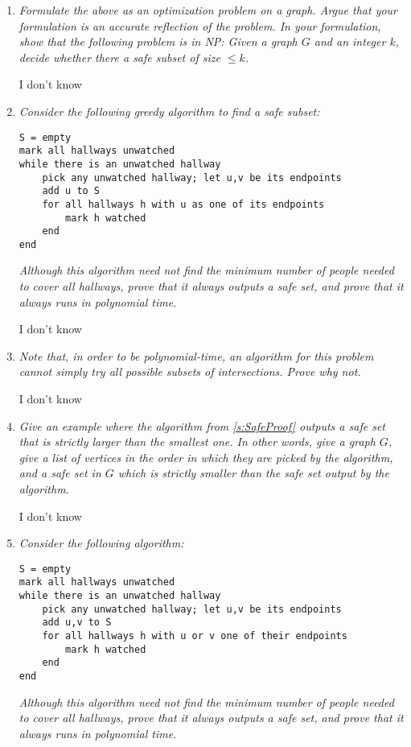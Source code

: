 \documentclass[12pt]{article} \setlength{\oddsidemargin}{0in}
\begin{document}
\begin{enumerate} 
\item\textit{Formulate the above as an optimization problem on a graph. Argue that your formulation is an accurate reflection of the problem. In your formulation, show that the following problem is in NP: Given a graph $G$ and an integer $k$, decide whether there a safe subset of size $\leq k$.}

I don't know 

\item\textit{Consider the following greedy algorithm to find a safe subset:} %
\begin{verbatim}
S = empty
mark all hallways unwatched
while there is an unwatched hallway
    pick any unwatched hallway; let u,v be its endpoints
    add u to S
    for all hallways h with u as one of its endpoints
        mark h watched
    end
end
\end{verbatim}
\textit{Although this algorithm need not find the minimum number of people needed to cover all hallways, prove that it always outputs a safe set, and prove that it always runs in polynomial time.}\label{s:SafeProof}

I don't know 
\item\textit{Note that, in order to be polynomial-time, an algorithm for this problem cannot simply try all possible subsets of intersections. Prove why not.}

I don't know 

\item\textit{Give an example where the algorithm from \ref{s:SafeProof} outputs a safe set that is strictly larger than the smallest one. In other words, give a graph $G$, give a list of vertices in the order in which they are picked by the algorithm, and a safe set in $G$ which is strictly smaller than the safe set output by the algorithm.}

I don't know 

\item\textit{Consider the following algorithm:} %
\begin{verbatim}
S = empty
mark all hallways unwatched
while there is an unwatched hallway
    pick any unwatched hallway; let u,v be its endpoints
    add u,v to S
    for all hallways h with u or v one of their endpoints
        mark h watched
    end
end
\end{verbatim}
\textit{Although this algorithm need not find the minimum number of people needed to cover all hallways, prove that it always outputs a safe set, and prove that it always runs in polynomial time.}\label{s:SafeProof2}


\end{enumerate}
\end{document}
